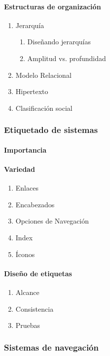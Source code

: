 \documentclass[12pt]{report}
\begin{document}
				\paragraph{Estructuras de organización}
					\begin{enumerate}
						\item Jerarquía
							\begin{enumerate}
								\item Diseñando jerarquías
								\item Amplitud vs. profundidad
							\end{enumerate}
						\item Modelo Relacional
						\item Hipertexto
						\item Clasificación social
					\end{enumerate}
			\subsubsection{Etiquetado de sistemas}
				\paragraph{Importancia}
				\paragraph{Variedad}
					\begin{enumerate}
						\item Enlaces
						\item Encabezados
						\item Opciones de Navegación
						\item Index
						\item Íconos
					\end{enumerate}
				\paragraph{Diseño de etiquetas}
					\begin{enumerate}
						\item Alcance
						\item Consistencia
						\item Pruebas
					\end{enumerate}
			\subsubsection{Sistemas de navegación}
\end{document}

